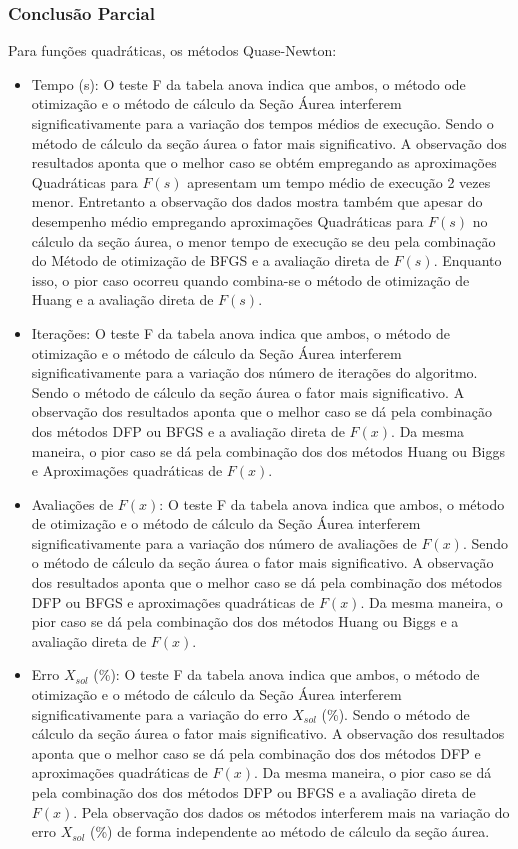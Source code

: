 \subsubsection{Conclusão Parcial}
        Para funções quadráticas, os métodos Quase-Newton:
        \begin{itemize}
            \item {Tempo (s):} O teste F da tabela anova indica que ambos, o método ode otimização e o método de cálculo da Seção Áurea interferem significativamente para a variação dos tempos médios de execução. Sendo o método de cálculo da seção áurea o fator mais significativo. A observação dos resultados aponta que o melhor caso se obtém empregando as aproximações Quadráticas para $F(s)$ apresentam um tempo médio de execução 2 vezes menor. Entretanto a observação dos dados mostra também que apesar do desempenho médio empregando aproximações Quadráticas para $F(s)$ no cálculo da seção áurea, o menor tempo de execução se deu pela combinação do Método de otimização de BFGS e a avaliação direta de $F(s)$. Enquanto isso, o pior caso ocorreu quando combina-se o método de otimização de Huang e a avaliação direta de $F(s)$. 
            \item {Iterações:}  O teste F da tabela anova indica que ambos, o método de otimização e o método de cálculo da Seção Áurea interferem significativamente para a variação dos número de iterações do algoritmo. Sendo o método de cálculo da seção áurea o fator mais significativo. A observação dos resultados aponta que o melhor caso se dá pela combinação dos métodos DFP ou BFGS e a avaliação direta de $F(x)$. Da mesma maneira, o pior caso se dá pela combinação dos dos métodos Huang ou Biggs e Aproximações quadráticas de $F(x)$.
            \item {Avaliações de $F(x)$:} O teste F da tabela anova indica que ambos, o método de otimização e o método de cálculo da Seção Áurea interferem significativamente para a variação dos número de avaliações de $F(x)$. Sendo o método de cálculo da seção áurea o fator mais significativo. A observação dos resultados aponta que o melhor caso se dá pela combinação dos métodos DFP ou BFGS e aproximações quadráticas de $F(x)$. Da mesma maneira, o pior caso se dá pela combinação dos dos métodos Huang ou Biggs e a avaliação direta de $F(x)$.
            \item {Erro $X_{sol}$ (\%):} O teste F da tabela anova indica que ambos, o método de otimização e o método de cálculo da Seção Áurea interferem significativamente para a variação do erro $X_{sol}$ (\%). Sendo o método de cálculo da seção áurea o fator mais significativo. A observação dos resultados aponta que o melhor caso se dá pela combinação dos dos métodos DFP e aproximações quadráticas de $F(x)$. Da mesma maneira, o pior caso se dá pela combinação dos dos métodos DFP ou BFGS e a avaliação direta de $F(x)$. Pela observação dos dados os métodos interferem mais na variação do erro $X_{sol}$ (\%) de forma independente ao método de cálculo da seção áurea.

\end{itemize}
